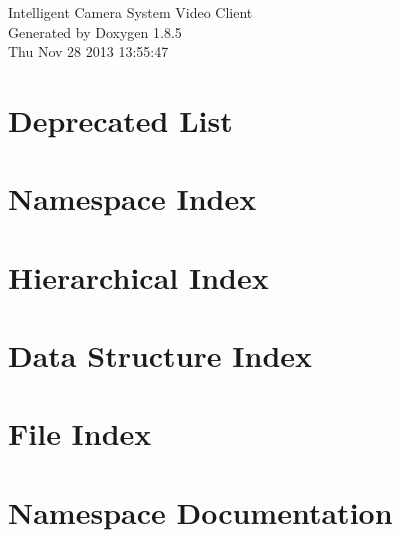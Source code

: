 \documentclass[twoside]{book}
\newcommand{\clearemptydoublepage}{%
  \newpage{\pagestyle{empty}\cleardoublepage}%
}
\begin{document}
\hypersetup{pageanchor=false}
\begin{titlepage}
\vspace*{7cm}
\begin{center}%
{\Large Intelligent Camera System Video Client }\\
\vspace*{1cm}
{\large Generated by Doxygen 1.8.5}\\
\vspace*{0.5cm}
{\small Thu Nov 28 2013 13:55:47}\\
\end{center}
\end{titlepage}
\clearemptydoublepage
\tableofcontents
\clearemptydoublepage
{}
\hypersetup{pageanchor=true}

\chapter{Deprecated List}
\label{deprecated}
\hypertarget{deprecated}{}

\chapter{Namespace Index}

\chapter{Hierarchical Index}

\chapter{Data Structure Index}

\chapter{File Index}

\chapter{Namespace Documentation}



\end{document}
